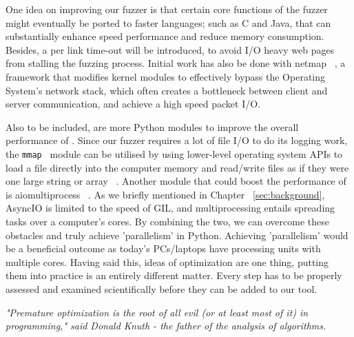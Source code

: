 One idea on improving our fuzzer is that certain core functions of the
fuzzer might eventually be ported to faster languages; such as C and Java, that can substantially enhance speed performance and reduce memory consumption. Besides, a per link time-out will be introduced, to avoid I/O heavy web pages from stalling the fuzzing process. Initial work has also be done with netmap  ~\cite{rizzo2011Netmap}, a framework that modifies kernel modules to effectively bypass the Operating System's network stack, which often creates a bottleneck between client and server communication, and achieve a high speed packet I/O.

Also to be included, are more Python modules to improve the overall performance of \pname{}. Since our fuzzer requires a lot of file I/O to do its logging work, the {\tt mmap } module can be utilised by using lower-level operating system APIs to load a file directly into the computer memory and read/write files as if they were one large string or array ~\cite{mmap}. Another module that could boost the performance of \pname{} is aiomultiprocess ~\cite{aiomultiprocess}. As we briefly mentioned in Chapter ~\ref{sec:background}, AsyncIO is limited to the speed of GIL, and multiprocessing entails spreading tasks over a computer's cores. By combining the two, we can overcome these obstacles and truly achieve 'parallelism' in Python. Achieving 'parallelism' would be a beneficial outcome as today's PCs/laptops have processing units with multiple cores.
Having said this, ideas of optimization are one thing, putting them into practice is an entirely different matter. Every step has to be properly assessed and examined scientifically before they can be added to our tool.

\textit{"Premature optimization is the root of all evil (or at least most of it) in programming," said Donald Knuth - the father of the analysis of algorithms.}